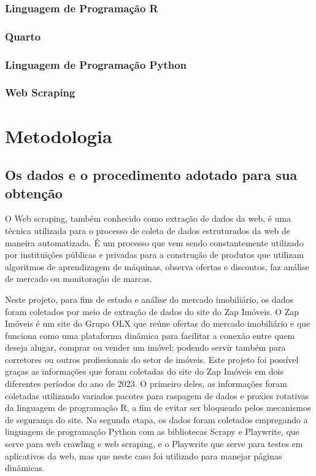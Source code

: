 \documentclass[
  letterpaper,
  DIV=11,
  numbers=noendperiod]{scrreprt}
\begin{document}
\subsection{Linguagem de Programação
R}\label{linguagem-de-programauxe7uxe3o-r}

\subsection{Quarto}\label{quarto}

\subsection{Linguagem de Programação
Python}\label{linguagem-de-programauxe7uxe3o-python}

\subsection{Web Scraping}\label{web-scraping}

\newpage

\chapter{Metodologia}\label{metodologia}

\section{Os dados e o procedimento adotado para sua
obtenção}\label{os-dados-e-o-procedimento-adotado-para-sua-obtenuxe7uxe3o}

\hfill\break

O Web scraping, também conhecido como extração de dados da web, é uma
técnica utilizada para o processo de coleta de dados estruturados da web
de maneira automatizada. É um processo que vem sendo constantemente
utilizado por instituições públicas e privadas para a construção de
produtos que utilizam algoritmos de aprendizagem de máquinas, observa
ofertas e discontos, faz análise de mercado ou monitoração de marcas.

Neste projeto, para fins de estudo e análise do mercado imobiliário, os
dados foram coletados por meio de extração de dados do site do Zap
Imóveis. O Zap Imóveis é um site do Grupo OLX que reúne ofertas do
mercado imobiliário e que funciona como uma plataforma dinâmica para
facilitar a conexão entre quem deseja alugar, comprar ou vender um
imóvel; podendo servir também para corretores ou outros profissionais do
setor de imóveis. Este projeto foi possível graças as informações que
foram coletadas do site do Zap Imóveis em dois diferentes períodos do
ano de 2023. O primeiro deles, as informações foram coletadas utilizando
variados pacotes para raspagem de dados e proxies rotativas da linguagem
de programação R, a fim de evitar ser bloqueado pelos mecanismos de
segurança do site. Na segunda etapa, os dados foram coletados empregando
a linguagem de programação Python com as bibliotecas Scrapy e Playwrite,
que serve para web crawling e web scraping, e o Playwrite que serve para
testes em aplicativos da web, mas que neste caso foi utilizado para
manejar páginas dinâmicas.
\end{document}
